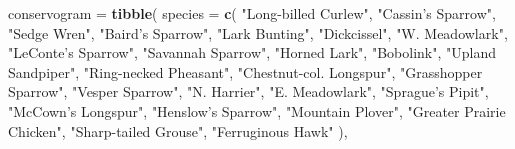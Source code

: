 \documentclass[]{article}
\newenvironment{Shaded}{\begin{snugshade}}{\end{snugshade}}
\newcommand{\KeywordTok}[1]{\textcolor[rgb]{0.13,0.29,0.53}{\textbf{#1}}}
\newcommand{\DataTypeTok}[1]{\textcolor[rgb]{0.13,0.29,0.53}{#1}}
\newcommand{\StringTok}[1]{\textcolor[rgb]{0.31,0.60,0.02}{#1}}
\newcommand{\NormalTok}[1]{#1}
\begin{document}
\begin{Shaded}
\begin{Highlighting}[]
\NormalTok{conservogram =}
\StringTok{  }\KeywordTok{tibble}\NormalTok{(}
    \DataTypeTok{species =} \KeywordTok{c}\NormalTok{(}
      \StringTok{"Long-billed Curlew"}\NormalTok{,}
      \StringTok{"Cassin's Sparrow"}\NormalTok{,}
      \StringTok{"Sedge Wren"}\NormalTok{,}
      \StringTok{"Baird's Sparrow"}\NormalTok{,}
      \StringTok{"Lark Bunting"}\NormalTok{,}
      \StringTok{"Dickcissel"}\NormalTok{,}
      \StringTok{"W. Meadowlark"}\NormalTok{,}
      \StringTok{"LeConte's Sparrow"}\NormalTok{,}
      \StringTok{"Savannah Sparrow"}\NormalTok{,}
      \StringTok{"Horned Lark"}\NormalTok{,}
      \StringTok{"Bobolink"}\NormalTok{,}
      \StringTok{"Upland Sandpiper"}\NormalTok{,}
      \StringTok{"Ring-necked Pheasant"}\NormalTok{,}
      \StringTok{"Chestnut-col. Longspur"}\NormalTok{,}
      \StringTok{"Grasshopper Sparrow"}\NormalTok{,}
      \StringTok{"Vesper Sparrow"}\NormalTok{,}
      \StringTok{"N. Harrier"}\NormalTok{,}
      \StringTok{"E. Meadowlark"}\NormalTok{,}
      \StringTok{"Sprague's Pipit"}\NormalTok{,}
      \StringTok{"McCown's Longspur"}\NormalTok{,}
      \StringTok{"Henslow's Sparrow"}\NormalTok{,}
      \StringTok{"Mountain Plover"}\NormalTok{,}
      \StringTok{"Greater Prairie Chicken"}\NormalTok{,}
      \StringTok{"Sharp-tailed Grouse"}\NormalTok{,}
      \StringTok{"Ferruginous Hawk"}
\NormalTok{    ),}
  

\end{Highlighting}
\end{Shaded}
\end{document}
